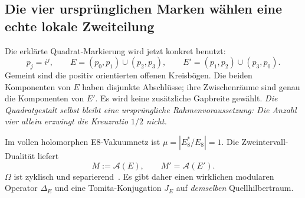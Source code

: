 \subsection{Die vier ursprünglichen Marken wählen eine echte lokale Zweiteilung}\label{sec:nativemodular}
Die erklärte Quadrat-Markierung wird jetzt konkret benutzt:
\begin{equation}
p_j=i^j,\qquad
E=(p_0,p_1)\cup(p_2,p_3),\qquad
E'=(p_1,p_2)\cup(p_3,p_0).
\end{equation}
Gemeint sind die positiv orientierten offenen Kreisbögen. Die beiden Komponenten von $E$ haben disjunkte Abschlüsse; ihre Zwischenräume sind genau die Komponenten von $E'$. Es wird keine zusätzliche Gapbreite gewählt. \emph{Die Quadratgestalt selbst bleibt eine ursprüngliche Rahmenvoraussetzung: Die Anzahl vier allein erzwingt die Kreuzratio $1/2$ nicht.}

\begin{center}
\end{center}

Im vollen holomorphen E8-Vakuumnetz ist $\mu=|E_8^*/E_8|=1$. Die Zweintervall-Dualität liefert
\begin{equation}
M:=\mathcal A(E),\qquad M'=\mathcal A(E').
\end{equation}
$\Omega$ ist zyklisch und separierend~\cite{dongxu}. Es gibt daher einen wirklichen modularen Operator $\Delta_E$ und eine Tomita-Konjugation $J_E$ auf \emph{demselben} Quellhilbertraum.

